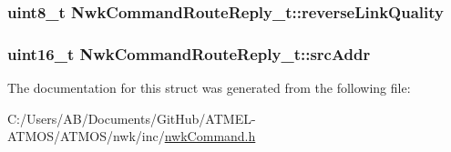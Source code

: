\hypertarget{struct_nwk_command_route_reply__t_a81f136b1386c5586b3a28be64c465a2e}{
\subsubsection[{reverse\-Link\-Quality}]{\setlength{\rightskip}{0pt plus 5cm}uint8\-\_\-t Nwk\-Command\-Route\-Reply\-\_\-t\-::reverse\-Link\-Quality}}\label{struct_nwk_command_route_reply__t_a81f136b1386c5586b3a28be64c465a2e}
\hypertarget{struct_nwk_command_route_reply__t_a2fe52bcf86d394d11af8cfdcda481c12}{
\subsubsection[{src\-Addr}]{\setlength{\rightskip}{0pt plus 5cm}uint16\-\_\-t Nwk\-Command\-Route\-Reply\-\_\-t\-::src\-Addr}}\label{struct_nwk_command_route_reply__t_a2fe52bcf86d394d11af8cfdcda481c12}


The documentation for this struct was generated from the following file\-:\begin{DoxyCompactItemize}
\item 
C\-:/\-Users/\-A\-B/\-Documents/\-Git\-Hub/\-A\-T\-M\-E\-L-\/\-A\-T\-M\-O\-S/\-A\-T\-M\-O\-S/nwk/inc/\hyperlink{nwk_command_8h}{nwk\-Command.\-h}\end{DoxyCompactItemize}
